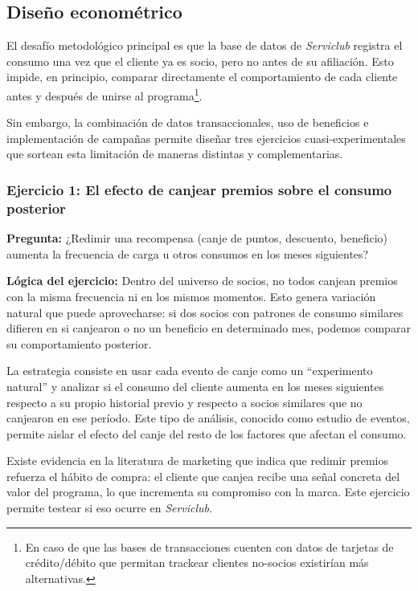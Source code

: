 \subsection{Diseño econométrico}

El desafío metodológico principal es que la base de datos de \emph{Serviclub} registra el consumo una vez que el cliente ya es socio, pero no antes de su afiliación. Esto impide, en principio, comparar directamente el comportamiento de cada cliente antes y después de unirse al programa\footnote{En caso de que las bases de transacciones cuenten con datos de tarjetas de crédito/débito que permitan trackear clientes no-socios existirían más alternativas.}.


Sin embargo, la combinación de datos transaccionales, uso de beneficios e implementación de campañas permite diseñar tres ejercicios cuasi-experimentales que sortean esta limitación de maneras distintas y complementarias. 



\subsubsection*{Ejercicio 1: El efecto de canjear premios sobre el consumo posterior}
\textbf{Pregunta:} ¿Redimir una recompensa (canje de puntos, descuento, beneficio) aumenta la frecuencia de carga u otros consumos en los meses siguientes?

\textbf{Lógica del ejercicio:} Dentro del universo de socios, no todos canjean premios con la misma frecuencia ni en los mismos momentos. Esto genera variación natural que puede aprovecharse: si dos socios con patrones de consumo similares difieren en si canjearon o no un beneficio en determinado mes, podemos comparar su comportamiento posterior.

La estrategia consiste en usar cada evento de canje como un ``experimento natural'' y analizar si el consumo del cliente aumenta en los meses siguientes respecto a su propio historial previo y respecto a socios similares que no canjearon en ese período. Este tipo de análisis, conocido como estudio de eventos, permite aislar el efecto del canje del resto de los factores que afectan el consumo.

Existe evidencia en la literatura de marketing que indica que redimir premios refuerza el hábito de compra: el cliente que canjea recibe una señal concreta del valor del programa, lo que incrementa su compromiso con la marca. Este ejercicio permite testear si eso ocurre en \emph{Serviclub}.

